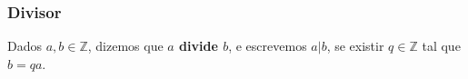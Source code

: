 \subsubsection*{Divisor}
Dados $a, b \in \mathbb{Z}$, dizemos que \textbf{$a$ divide $b$}, e escrevemos $a|b$, se existir $q \in \mathbb{Z}$ tal que $b = qa$.